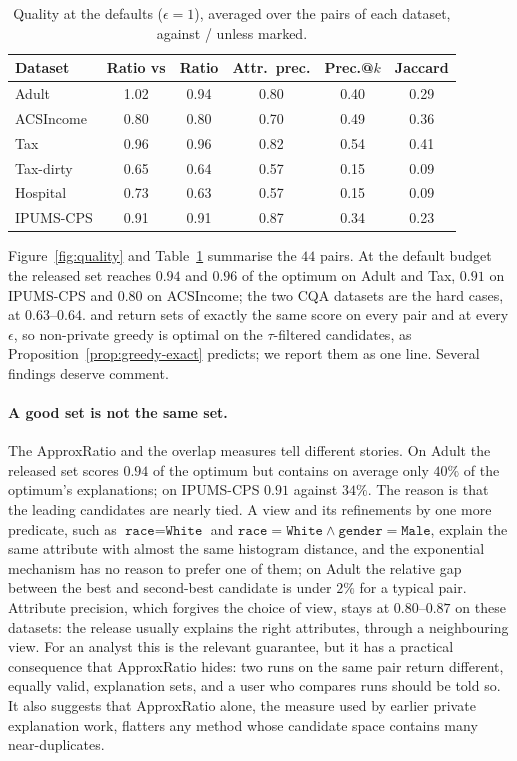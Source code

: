 \begin{table}[t]
\centering
\small
\caption{Quality at the defaults ($\epsilon=1$), averaged over the pairs of each dataset, against \Btwo{}/\Bthree{} unless marked.}
\label{tab:quality}
\setlength{\tabcolsep}{3.5pt}
\begin{tabular}{@{}lccccc@{}}
\toprule
Dataset & Ratio vs \Bone{} & Ratio & Attr.\ prec. & Prec.@$k$ & Jaccard\\
\midrule
Adult      & 1.02 & 0.94 & 0.80 & 0.40 & 0.29\\
ACSIncome  & 0.80 & 0.80 & 0.70 & 0.49 & 0.36\\
Tax        & 0.96 & 0.96 & 0.82 & 0.54 & 0.41\\
Tax-dirty  & 0.65 & 0.64 & 0.57 & 0.15 & 0.09\\
Hospital   & 0.73 & 0.63 & 0.57 & 0.15 & 0.09\\
IPUMS-CPS  & 0.91 & 0.91 & 0.87 & 0.34 & 0.23\\
\bottomrule
\end{tabular}
\end{table}

Figure~\ref{fig:quality} and Table~\ref{tab:quality} summarise the $44$ pairs.
At the default budget the released set reaches $0.94$ and $0.96$ of the optimum on Adult and Tax, $0.91$ on IPUMS-CPS and $0.80$ on ACSIncome; the two CQA datasets are the hard cases, at $0.63$--$0.64$.
\Btwo{} and \Bthree{} return sets of exactly the same score on every pair and at every $\epsilon$, so non-private greedy is optimal on the $\tau$-filtered candidates, as Proposition~\ref{prop:greedy-exact} predicts; we report them as one line.
Several findings deserve comment.

\paragraph{A good set is not the same set.}
The ApproxRatio and the overlap measures tell different stories.
On Adult the released set scores $0.94$ of the optimum but contains on average only $40\%$ of the optimum's explanations; on IPUMS-CPS $0.91$ against $34\%$.
The reason is that the leading candidates are nearly tied.
A view and its refinements by one more predicate, such as $\texttt{race}=\texttt{White}$ and $\texttt{race}=\texttt{White}\wedge\texttt{gender}=\texttt{Male}$, explain the same attribute with almost the same histogram distance, and the exponential mechanism has no reason to prefer one of them; on Adult the relative gap between the best and second-best candidate is under $2\%$ for a typical pair.
Attribute precision, which forgives the choice of view, stays at $0.80$--$0.87$ on these datasets: the release usually explains the right attributes, through a neighbouring view.
For an analyst this is the relevant guarantee, but it has a practical consequence that ApproxRatio hides: two runs on the same pair return different, equally valid, explanation sets, and a user who compares runs should be told so.
It also suggests that ApproxRatio alone, the measure used by earlier private explanation work, flatters any method whose candidate space contains many near-duplicates.

